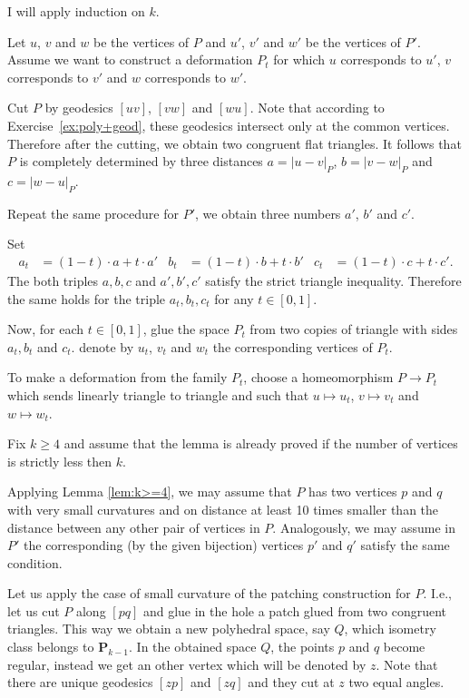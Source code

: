  





I will apply induction on $k$.

Let $u$, $v$ and $w$ be the vertices of $P$
and $u'$, $v'$ and $w'$ be the vertices of $P'$.
Assume we want to construct a deformation $P_t$ for which 
$u$ corresponds to $u'$, 
$v$ corresponds to $v'$
and
$w$ corresponds to $w'$.

Cut $P$ by geodesics $[uv]$, $[vw]$ and $[wu]$.
Note that according to Exercise~\ref{ex:poly+geod}, these geodesics
intersect only at the common vertices.
Therefore after the cutting,
we obtain two congruent flat triangles.
It follows that $P$ is completely determined 
by three distances $a=|u-v|_P$, $b=|v-w|_P$ and $c=|w-u|_P$.

Repeat the same procedure for $P'$, 
we obtain three numbers $a'$, $b'$ and $c'$.

Set
\begin{align*}
a_t
&=(1-t)\cdot a+t\cdot a'
&
b_t
&=(1-t)\cdot b+t\cdot b'
&
c_t
&=(1-t)\cdot c+t\cdot c'.
\end{align*}
The both triples $a,b,c$ and $a',b',c'$
satisfy the strict triangle inequality.
Therefore the same holds for the triple $a_t,b_t,c_t$ for any $t\in[0,1]$.

Now, for each $t\in[0,1]$, 
glue the space $P_t$ from two copies of triangle with sides $a_t,b_t$ and $c_t$.
denote by $u_t$, $v_t$ and $w_t$ the corresponding vertices of $P_t$.

To make a deformation from the family $P_t$,
choose a homeomorphism $P\to P_t$ which sends linearly triangle to triangle and such that $u\mapsto u_t$, $v\mapsto v_t$ and $w\mapsto w_t$.

Fix $k\ge 4$
and assume that the lemma is already proved if the number of vertices is strictly less then $k$.

Applying Lemma \ref{lem:k>=4},
we may assume that $P$ has two vertices
$p$ and $q$ with very small curvatures and on distance at least 10 times smaller than the distance between any other pair of vertices in $P$.
Analogously, we may assume in $P'$ the corresponding (by the given bijection) vertices 
$p'$ and $q'$ satisfy the same condition.

Let us apply the case of small curvature of the patching construction for $P$.
I.e.,
let us cut $P$ along $[pq]$ and glue in the hole a patch glued from two congruent triangles. 
This way we obtain a new polyhedral space, say $Q$,
which isometry class belongs to $\mathbf{P}_{k-1}$.
In the obtained space $Q$, the points $p$ and $q$ become regular, instead we get an other vertex which will be denoted by $z$.
Note that there are unique geodesics $[zp]$ and $[zq]$ and they cut at $z$ two equal angles.
 
